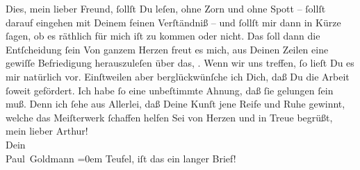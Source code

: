 \begin{ledgroupsized}[t]{13cm}
           \pstart
           Dies, mein lieber Freund, ſollſt Du leſen, ohne Zorn und ohne Spott – ſollſt darauf
               eingehen mit Deinem feinen Verſtändniß – und ſollſt mir dann in Kürze ſagen, \strikeout{\textcolor{gray}{×}\-\textcolor{gray}{×}\-\textcolor{gray}{×}\-\textcolor{gray}{×}\-\textcolor{gray}{×}} ob
                   es räthlich für mich iſt zu kommen oder nicht.
               Das ſoll dann die Entſcheidung ſein{\dotsfour}\pend
           \pstart
           Von ganzem Herzen freut es mich, aus Deinen Zeilen eine gewiſſe Befriedigung
               herauszuleſen über das, \label{K_L02608-4v}\label{K_L02608-4h}. Wenn
               wir uns treffen, ſo lieſt Du es mir {\pb}natürlich vor.
               Einſtweilen aber berglückwünſche ich Dich, daß Du die Arbeit ſoweit gefördert. Ich
               habe ſo eine unbeſtimmte Ahnung, daß ſie gelungen ſein muß. Denn ich ſehe aus
               Allerlei, daß Deine Kunſt jene Reife und Ruhe gewinnt, welche das Meiſterwerk
               ſchaffen helfen{\dotsfour}\pend
           \pstart
           Sei von Herzen und in Treue begrüßt, mein lieber Arthur!{\\[\baselineskip]} Dein{\\[\baselineskip]}\spacefill\mbox{Paul Goldmann}\pend
           \leftskip=0em{}\pstart
           \noindent{}Teufel, iſt das ein langer Brief!\pend
           \endnumbering{}\end{ledgroupsized}  \newcommand{\dateiname}{L02608}\newcommand{\titel}{Paul Goldmann an Arthur Schnitzler, 29. 7. [1894]}\newcommand{\editorInnen}{Martin Anton Müller und Laura Untner}
      